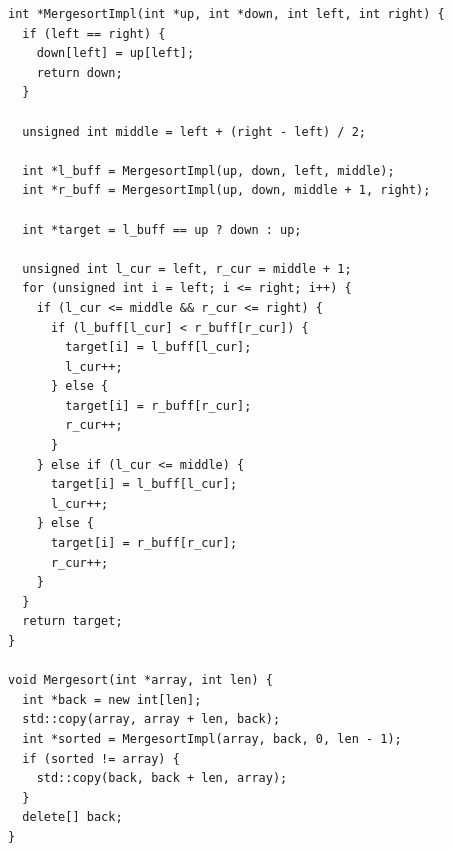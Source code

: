 \begin{verbatim}
int *MergesortImpl(int *up, int *down, int left, int right) {
  if (left == right) {
    down[left] = up[left];
    return down;
  }

  unsigned int middle = left + (right - left) / 2;

  int *l_buff = MergesortImpl(up, down, left, middle);
  int *r_buff = MergesortImpl(up, down, middle + 1, right);

  int *target = l_buff == up ? down : up;

  unsigned int l_cur = left, r_cur = middle + 1;
  for (unsigned int i = left; i <= right; i++) {
    if (l_cur <= middle && r_cur <= right) {
      if (l_buff[l_cur] < r_buff[r_cur]) {
        target[i] = l_buff[l_cur];
        l_cur++;
      } else {
        target[i] = r_buff[r_cur];
        r_cur++;
      }
    } else if (l_cur <= middle) {
      target[i] = l_buff[l_cur];
      l_cur++;
    } else {
      target[i] = r_buff[r_cur];
      r_cur++;
    }
  }
  return target;
}

void Mergesort(int *array, int len) {
  int *back = new int[len];
  std::copy(array, array + len, back);
  int *sorted = MergesortImpl(array, back, 0, len - 1);
  if (sorted != array) {
    std::copy(back, back + len, array);
  }
  delete[] back;
}
\end{verbatim}